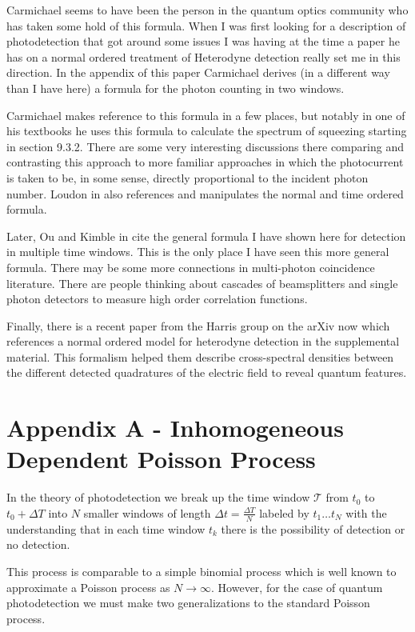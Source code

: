 \documentclass[12pt]{article}
\begin{document}
Carmichael seems to have been the person in the quantum optics community who has taken some hold of this formula. When I was first looking for a description of photodetection that got around some issues I was having at the time a paper he has on a normal ordered  treatment of Heterodyne detection \cite{Carmichael1987} really set me in this direction. In the appendix of this paper Carmichael derives (in a different way than I have here) a formula for the photon counting in two windows. 

Carmichael makes reference to this formula in a few places, but notably in one of his textbooks \cite{Carmichael2009} he uses this formula to calculate the spectrum of squeezing starting in section 9.3.2. There are some very interesting discussions there comparing and contrasting this approach to more familiar approaches in which the photocurrent is taken to be, in some sense, directly proportional to the incident photon number. Loudon in \cite{Loudon2000} also references and manipulates the normal and time ordered formula.

Later, Ou and Kimble in \cite{Ou1995} cite the general formula I have shown here for detection in multiple time windows. This is the only place I have seen this more general formula. There may be some more connections in multi-photon coincidence literature. There are people thinking about cascades of beamsplitters and single photon detectors to measure high order correlation functions.

Finally, there is a recent paper from the Harris group \cite{Shkarin2017} on the arXiv now which references a normal ordered model for heterodyne detection in the supplemental material. This formalism helped them describe cross-spectral densities between the different detected quadratures of the electric field to reveal quantum features.

\section{Appendix A - Inhomogeneous Dependent Poisson Process}

In the theory of photodetection we break up the time window $\mathcal{T}$ from $t_0$ to $t_0+\Delta T$ into $N$ smaller windows of length $\Delta t = \frac{\Delta T}{N}$ labeled by $t_1 \ldots t_N$ with the understanding that in each time window $t_k$ there is the possibility of detection or no detection.

This process is comparable to a simple binomial process which is well known to approximate a Poisson process as $N \rightarrow \infty$. However, for the case of quantum photodetection we must make two generalizations to the standard Poisson process. 
\end{document}

